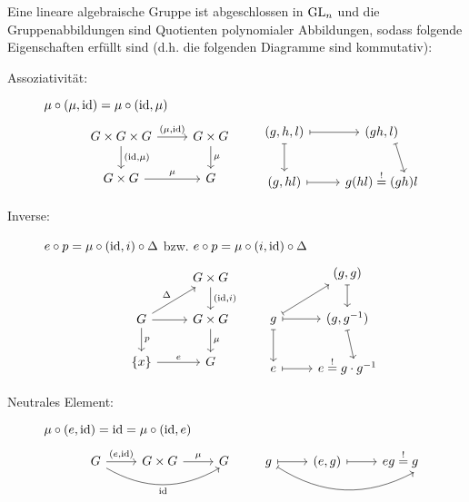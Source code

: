 	Eine lineare algebraische Gruppe ist abgeschlossen in $\operatorname{GL}_n$ und die Gruppenabbildungen sind Quotienten polynomialer Abbildungen, sodass folgende Eigenschaften erfüllt sind (d.h. die folgenden Diagramme sind kommutativ):
	\begin{description}
		\item[Assoziativität:] $\mu \circ (\mu,\operatorname{id}) = \mu \circ (\operatorname{id},\mu)$
		\[ \begin{tikzcd}
		G \times G \times G \rar{(\mu,\id)} \dar{(\id,\mu)} & G \times G \dar{\mu} \\
		G \times G \rar{\mu} & G
		\end{tikzcd} \qquad	\begin{tikzcd}
		(g,h,l) \rar[mapsto] \dar[mapsto]& (gh, l) \arrow[d,end anchor={[xshift=-1.5em,yshift=-0.5em]north east},mapsto]\\
		(g, hl) \rar[mapsto] & g(hl) \stackrel{!}{=} (gh)l
		\end{tikzcd} \]
		\item[Inverse:] $e \circ p = \mu \circ (\operatorname{id},i) \circ \Delta$ bzw. $e \circ p = \mu \circ (i,\operatorname{id}) \circ \Delta$
		\[ \begin{tikzcd}
		\mbox{} & G \times G \dar{(\id, i)} \\
		G \rar \dar{p}  \urar{\Delta} & G \times G \dar{\mu} \\
		\{x\}  \rar{e} & G
		\end{tikzcd} \qquad	\begin{tikzcd}
		\mbox{} & (g,g) \dar[mapsto] \\
		g \rar[mapsto] \urar[mapsto] \dar[mapsto]& (g, g ^{-1}) \arrow[d,end anchor={[xshift=0.5em,yshift=-0.5em]},mapsto] \\
		e \rar[mapsto]& e \stackrel{!}{=} g \cdot g ^{-1}
		\end{tikzcd} \]
		\item[Neutrales Element:] $\mu \circ (e,\operatorname{id}) = \operatorname{id} = \mu \circ (\operatorname{id},e)$
		\[ \begin{tikzcd}
		G \rar{(e,\id)} \arrow[bend right, swap,end anchor={[xshift=0.5em]}]{rr}{\id} & G \times G \rar{\mu} &  G
		\end{tikzcd} \qquad \begin{tikzcd}
		g \rar[mapsto] \arrow[bend right,mapsto,end anchor={[xshift=2.5em]}]{rr} & (e,g) \rar[mapsto] & eg \stackrel{!}{=} g
		\end{tikzcd} \]
	\end{description}
	

